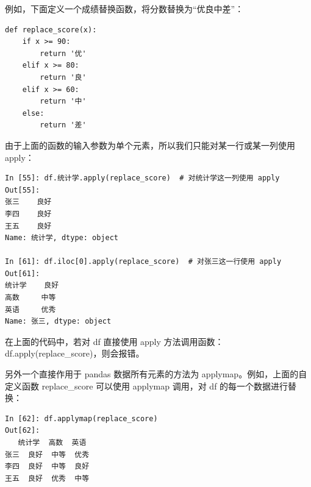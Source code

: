例如，下面定义一个成绩替换函数，将分数替换为``优良中差”：

\begin{lstlisting}[Language=Python]
def replace_score(x):
    if x >= 90:
        return '优'
    elif x >= 80:
        return '良'
    elif x >= 60:
        return '中'
    else:
        return '差'
\end{lstlisting}

由于上面的函数的输入参数为单个元素，所以我们只能对某一行或某一列使用 apply：

\begin{lstlisting}[Language=Python]
In [55]: df.统计学.apply(replace_score)  # 对统计学这一列使用 apply
Out[55]:
张三    良好
李四    良好
王五    良好
Name: 统计学, dtype: object

In [61]: df.iloc[0].apply(replace_score)  # 对张三这一行使用 apply
Out[61]:
统计学    良好
高数     中等
英语     优秀
Name: 张三, dtype: object
\end{lstlisting}

在上面的代码中，若对 df 直接使用 apply 方法调用函数：df.apply(replace\_score)，则会报错。

另外一个直接作用于 pandas 数据所有元素的方法为 applymap。例如，上面的自定义函数 replace\_score 可以使用 applymap 调用，对 df 的每一个数据进行替换：

\begin{lstlisting}[Language=Python]
In [62]: df.applymap(replace_score)
Out[62]:
   统计学  高数  英语
张三  良好  中等  优秀
李四  良好  中等  良好
王五  良好  优秀  中等
\end{lstlisting}
